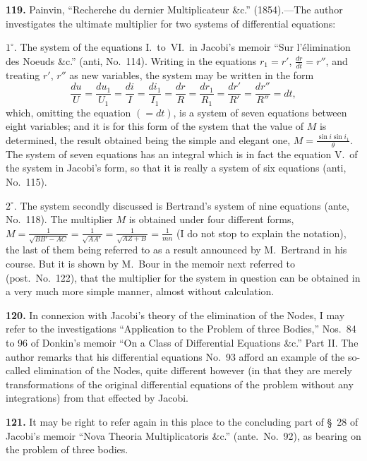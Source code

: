 \documentclass[11pt,a4paper]{article}
\theoremstyle{definition}
\begin{document}
\textbf{119.} Painvin, ``Recherche du dernier Multiplicateur \&c.'' (1854).---The author investigates the ultimate multiplier for two systems of differential equations:

$1^\circ$. The system of the equations I.~to~VI.\ in Jacobi's memoir ``Sur l'\'elimination des Noeuds \&c.'' (anti, No.~114). Writing in the equations $r_1 = r'$, $\frac{dr}{dt} = r''$, and treating $r'$, $r''$ as new variables, the system may be written in the form
\[
\frac{du}{U} = \frac{du_1}{U_1} = \frac{di}{I} = \frac{di_1}{I_1} = \frac{dr}{R} = \frac{dr_1}{R_1} = \frac{dr'}{R'} = \frac{dr''}{R''} = dt,
\]
which, omitting the equation $(=dt)$, is a system of seven equations between eight variables; and it is for this form of the system that the value of $M$ is determined, the result obtained being the simple and elegant one, $M = \frac{\sin i \sin i_1}{\theta}$. The system of seven equations has an integral which is in fact the equation V.\ of the system in Jacobi's form, so that it is really a system of six equations (anti, No.~115).

$2^\circ$. The system secondly discussed is Bertrand's system of nine equations (ante, No.~118). The multiplier $M$ is obtained under four different forms, $M = \frac{1}{\sqrt{BB' - AC}} = \frac{1}{\sqrt{AA'}} = \frac{1}{\sqrt{AZ + B}} = \frac{1}{mn}$ (I do not stop to explain the notation), the last of them being referred to as a result announced by M.~Bertrand in his course. But it is shown by M.~Bour in the memoir next referred to (post.\ No.~122), that the multiplier for the system in question can be obtained in a very much more simple manner, almost without calculation.

\textbf{120.} In connexion with Jacobi's theory of the elimination of the Nodes, I may refer to the investigations ``Application to the Problem of three Bodies,'' Nos.~84 to 96 of Donkin's memoir ``On a Class of Differential Equations \&c.'' Part II. The author remarks that his differential equations No.~93 afford an example of the so-called elimination of the Nodes, quite different however (in that they are merely transformations of the original differential equations of the problem without any integrations) from that effected by Jacobi.

\textbf{121.} It may be right to refer again in this place to the concluding part of \S~28 of Jacobi's memoir ``Nova Theoria Multiplicatoris \&c.'' (ante.\ No.~92), as bearing on the problem of three bodies.
\end{document}
